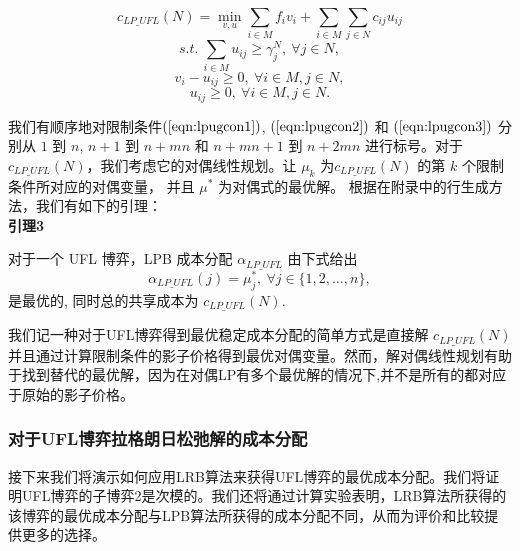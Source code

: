 \documentclass[UTF8]{article}
\begin{document}
\begin{定义}
      \begin{equation*}\label{eqn:lpugobj}
      c_{LP\_UFL}(N) = \min_{v,u} \sum_{i \in M} f_iv_i + \sum_{i \in M} \sum_{j \in N} c_{ij}u_{ij}
      \end{equation*}
      \begin{equation} \label{eqn:lpugcon1}
      s.t.~\sum_{i \in M} u_{ij} \geq \gamma_j^N, ~\forall j \in N,
      \end{equation}
      \begin{equation}\label{eqn:lpugcon2}
      v_i - u_{ij} \geq 0, ~\forall i \in M, j \in N,
      \end{equation}
      \begin{equation}\label{eqn:lpugcon3}
      u_{ij} \geq 0, ~\forall i \in M, j \in N.
      \end{equation}

      我们有顺序地对限制条件$(\ref{eqn:lpugcon1})$, $(\ref{eqn:lpugcon2})$ 和 $(\ref{eqn:lpugcon3})$ 分别从 $1$ 到 $n$, $n+1$ 到 $n+mn$ 和 $n+mn+1$ 到 $n+2mn$ 进行标号。对于 $c_{LP\_UFL}(N)$，我们考虑它的对偶线性规划。让 $\mu_k$ 为$c_{LP\_UFL}(N)$ 的第 $k$ 个限制条件所对应的对偶变量， 并且 $\mu^*$ 为对偶式的最优解。
      根据在附录中的行生成方法，我们有如下的引理：\\

      \textbf{引理3}
      \begin{lemma}\label{lemma:lpbcaufl}
      对于一个 UFL 博弈，LPB 成本分配 $\alpha_{LP\_UFL}$ 由下式给出
      \begin{equation*}
      \alpha_{LP\_UFL}(j) = \mu_j^*, ~\forall j \in \big\{1,2,\ldots,n\big\},
      \end{equation*}
      是最优的, 同时总的共享成本为 $c_{LP\_UFL}(N)$.
      \end{lemma}

      我们记一种对于UFL博弈得到最优稳定成本分配的简单方式是直接解 $c_{LP\_UFL}(N)$ 并且通过计算限制条件的影子价格得到最优对偶变量。然而，解对偶线性规划有助于找到替代的最优解，因为在对偶LP有多个最优解的情况下,并不是所有的都对应于原始的影子价格。

      \subsubsection{对于UFL博弈拉格朗日松弛解的成本分配}
      接下来我们将演示如何应用LRB算法来获得UFL博弈的最优成本分配。我们将证明UFL博弈的子博弈2是次模的。我们还将通过计算实验表明，LRB算法所获得的该博弈的最优成本分配与LPB算法所获得的成本分配不同，从而为评价和比较提供更多的选择。


\end{定义}
\end{document}
